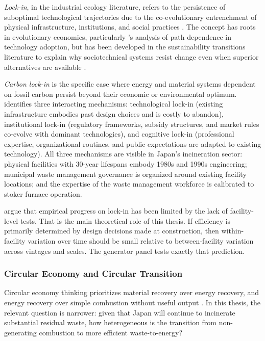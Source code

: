 \documentclass[12pt,a4paper]{article}
\begin{document}
\emph{Lock-in}, in the industrial ecology literature, refers to the persistence of suboptimal technological trajectories due to the co-evolutionary entrenchment of physical infrastructure, institutions, and social practices \citep{Unruh2000}. The concept has roots in evolutionary economics, particularly \citet{Arthur1989}'s analysis of path dependence in technology adoption, but has been developed in the sustainability transitions literature to explain why sociotechnical systems resist change even when superior alternatives are available \citep{Geels2004}.

\emph{Carbon lock-in} is the specific case where energy and material systems dependent on fossil carbon persist beyond their economic or environmental optimum. \citet{Unruh2000} identifies three interacting mechanisms: technological lock-in (existing infrastructure embodies past design choices and is costly to abandon), institutional lock-in (regulatory frameworks, subsidy structures, and market rules co-evolve with dominant technologies), and cognitive lock-in (professional expertise, organizational routines, and public expectations are adapted to existing technology). All three mechanisms are visible in Japan's incineration sector: physical facilities with 30-year lifespans embody 1980s and 1990s engineering; municipal waste management governance is organized around existing facility locations; and the expertise of the waste management workforce is calibrated to stoker furnace operation.

\citet{Seto2016} argue that empirical progress on lock-in has been limited by the lack of facility-level tests. That is the main theoretical role of this thesis. If efficiency is primarily determined by design decisions made at construction, then within-facility variation over time should be small relative to between-facility variation across vintages and scales. The generator panel tests exactly that prediction.

\subsubsection{Circular Economy and Circular Transition}

Circular economy thinking prioritizes material recovery over energy recovery, and energy recovery over simple combustion without useful output \citep{EllenMacArthur2013}. In this thesis, the relevant question is narrower: given that Japan will continue to incinerate substantial residual waste, how heterogeneous is the transition from non-generating combustion to more efficient waste-to-energy?
\end{document}
